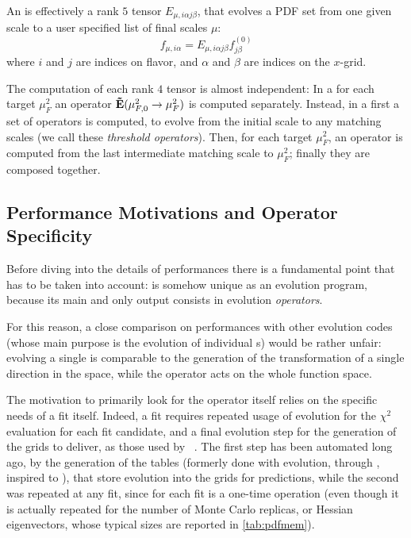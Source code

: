 An \eko{} is effectively a rank $5$ tensor $E_{\mu,i \alpha j \beta}$, that
evolves a PDF set from one given scale to a user specified list of final scales
$\mu$:
\begin{equation}
    f_{\mu,i\alpha} = E_{\mu,i \alpha j \beta} f^{(0)}_{j \beta}
\end{equation}
where $i$ and $j$ are indices on flavor, and $\alpha$ and $\beta$ are indices on the $x$-grid.

The computation of each rank $4$ tensor is almost independent:
In a \ffns{} for each target $\mu_F^2$ an operator $\vb{\tilde E}(\mu_{F,0}^2 \to \mu_F^2)$ is computed separately.
Instead, in a \vfns{} first a set of operators is computed, to evolve from the
initial scale to any matching scales (we call these \textit{threshold
operators}). Then, for each target $\mu_F^2$, an operator is computed
from the last intermediate matching scale to $\mu_F^2$; finally
they are composed together.

\subsection{Performance Motivations and Operator Specificity}
\label{app:code:motiv}

Before diving into the details of \eko{} performances there is a fundamental
point that has to be taken into account: \eko{} is somehow unique as an
evolution program, because its main and only output consists in evolution
\textit{operators}.

For this reason, a close comparison on performances with other evolution codes
(whose main purpose is the evolution of individual \pdf{}s) would be rather
unfair: evolving a single \pdf{} is comparable to the generation of the
transformation of a single direction in the \pdf{} space, while the operator acts
on the whole function space.

The motivation to primarily look for the operator itself relies on the specific
needs of a \pdf{} fit itself.
Indeed, a fit requires repeated usage of evolution for the $\chi^2$ evaluation
for each fit candidate, and a final evolution step for the generation of the
\pdf{} grids to deliver, as those used by \lhapdf{}~\cite{Buckley:2014ana}.
The first step has been automated long ago, by the generation of the
\fk{} tables (formerly done with \apfel{} evolution, through
\href{https://github.com/NNPDF/apfelcomb}{\apfelcomb}, inspired to
\cite{Bertone:2016lga}), that store \pdf{} evolution into the grids for
predictions, while the second was repeated at any fit, since for each fit is a
one-time operation (even though it is actually repeated for the number of Monte
Carlo replicas, or Hessian eigenvectors, whose typical sizes are reported in
\cref{tab:pdfmem}).


